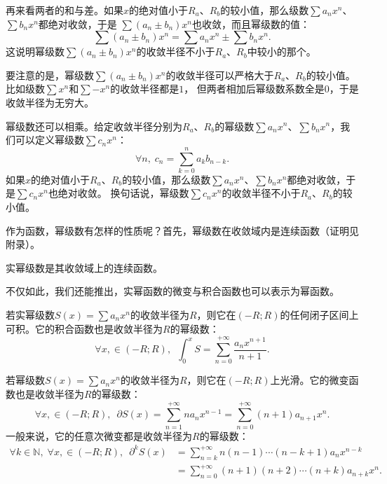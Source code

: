 \documentclass[12pt,UTF8]{ctexbook}
\begin{document}
再来看两者的和与差。如果$x$的绝对值小于$R_a$、$R_b$的较小值，那么级数$\sum a_n x^n$、$\sum b_n x^n$都绝对收敛，于是
$\sum (a_n \pm b_n) x^n$也收敛，而且幂级数的值：
$$\sum (a_n \pm b_n) x^n = \sum a_n x^n \pm \sum b_n x^n.$$
这说明幂级数$\sum (a_n \pm b_n) x^n$的收敛半径不小于$R_a$、$R_b$中较小的那个。

要注意的是，幂级数$\sum (a_n \pm b_n) x^n$的收敛半径可以严格大于$R_a$、$R_b$的较小值。比如级数$\sum x^n$和$\sum -x^n$的收敛半径都是$1$，
但两者相加后幂级数系数全是$0$，于是收敛半径为无穷大。

幂级数还可以相乘。给定收敛半径分别为$R_a$、$R_b$的幂级数$\sum a_n x^n$、$\sum b_n x^n$，我们可以定义幂级数$\sum c_n x^n$：
$$ \forall n, \; c_n = \sum_{k=0}^n a_k b_{n-k}.$$
如果$x$的绝对值小于$R_a$、$R_b$的较小值，那么级数$\sum a_n x^n$、$\sum b_n x^n$都绝对收敛，于是$\sum c_n x^n$也绝对收敛。
换句话说，幂级数$\sum c_n x^n$的收敛半径不小于$R_a$、$R_b$的较小值。

作为函数，幂级数有怎样的性质呢？首先，幂级数在收敛域内是连续函数（证明见附录）。

\begin{tm}
    实幂级数是其收敛域上的连续函数。
\end{tm}

不仅如此，我们还能推出，实幂函数的微变与积合函数也可以表示为幂函数。

\begin{tm}
    若实幂级数$S(x) = \sum a_n x^n$的收敛半径为$R$，则它在$(-R;R)$的任何闭子区间上可积。它的积合函数也是收敛半径为$R$的幂级数：
    $$ \forall x, \in (-R;R),\,\,\, \int_0^x S =  \sum_{n=0}^{+\infty} \frac{a_n x^{n+1}}{n + 1}. $$
\end{tm}

\begin{tm}
    若幂级数$S(x) = \sum a_n x^n$的收敛半径为$R$，则它在$(-R;R)$上光滑。它的微变函数也是收敛半径为$R$的幂级数：
    $$ \forall x, \in (-R;R),\,\,\, \partial S(x) =  \sum_{n=1}^{+\infty} na_n x^{n-1} = \sum_{n=0}^{+\infty} (n + 1)a_{n+1} x^{n}. $$
    一般来说，它的任意次微变都是收敛半径为$R$的幂级数：
    \begin{align*}
        \forall k \in \mathbb{N},\;\forall x, \in (-R;R),\,\,\, \partial^k S(x) &= \sum_{n=k}^{+\infty} n(n-1)\cdots(n - k + 1)a_n x^{n-k} \\
        &= \sum_{n=0}^{+\infty} (n + 1)(n + 2)\cdots(n + k)a_{n+k} x^{n}. \\
    \end{align*}
\end{tm}
\end{document}
